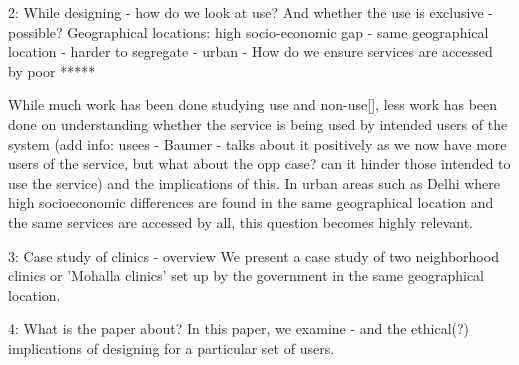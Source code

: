 2: While designing - how do we look at use? And whether the use is exclusive - possible? 
Geographical locations: high socio-economic gap - same geographical location - harder to segregate - urban - How do we ensure services are accessed by poor
*****

While much work has been done studying use and non-use[], less work has been done on understanding whether the service is being used by intended users of the system (add info: usees - Baumer - talks about it positively as we now have more users of the service, but what about the opp case? can it hinder those intended to use the service) and the implications of this. In urban areas such as Delhi where high socioeconomic differences are found in the same geographical location and the same services are accessed by all, this question becomes highly relevant.

3: Case study of clinics - overview
We present a case study of two neighborhood clinics or 'Mohalla clinics' set up by the government in the same geographical location. 

4: What is the paper about?
In this paper, we examine - and the ethical(?) implications of designing for a particular set of users.
